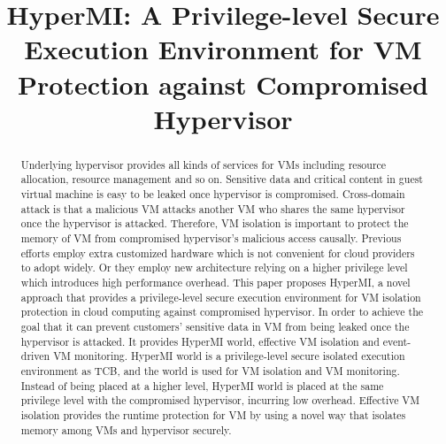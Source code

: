 \documentclass[conference]{IEEEtran}
\begin{document}
\title{HyperMI: A Privilege-level Secure Execution Environment for VM Protection against Compromised Hypervisor}
\author{%
}
\maketitle
\begin{abstract}
\iffalse
Underlying hypervisor provides all kinds of services for VMs including resource allocation, resource management and so on. Sensitive data and critical content in guest virtual machine is easy to be leaked once hypervisor is compromised. 
Cross-domain attack is that a malicious VM attacks another VM who shares the same hypervisor once the hypervisor is attacked. Therefore, VM isolation is important to protect the memory of VM from compromised hypervisor's malicious access causally. Previous efforts employ extra customized hardware which is not convenient for cloud providers to adopt widely. Or they employ new architecture relying on a higher privilege level which introduces high performance overhead.
This paper proposes HyperMI, a novel approach that provides a privilege-level secure execution environment for VM isolation protection in cloud computing against compromised hypervisor. In order to achieve the goal that it can prevent customers' sensitive data in VM from being leaked once the hypervisor is attacked.
It provides HyperMI world, effective VM isolation and event-driven VM monitoring. HyperMI world is a privilege-level secure isolated execution environment as TCB, and the world is used for VM isolation and VM monitoring.
Instead of being placed at a higher level,
HyperMI world is placed at the same privilege level with the compromised hypervisor, incurring low overhead. Effective VM isolation provides the runtime protection for VM by using a novel way that isolates memory among VMs and hypervisor securely. 

\end{abstract}
\end{document}
